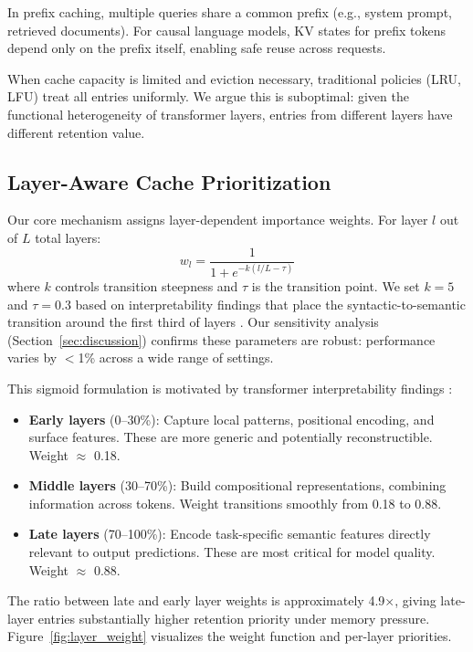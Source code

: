\documentclass[10pt,conference]{IEEEtran}
\begin{document}
In prefix caching, multiple queries share a common prefix (e.g., system prompt, retrieved documents). For causal language models, KV states for prefix tokens depend only on the prefix itself, enabling safe reuse across requests.

When cache capacity is limited and eviction necessary, traditional policies (LRU, LFU) treat all entries uniformly. We argue this is suboptimal: given the functional heterogeneity of transformer layers, entries from different layers have different retention value.

\subsection{Layer-Aware Cache Prioritization}

Our core mechanism assigns layer-dependent importance weights. For layer $l$ out of $L$ total layers:
\begin{equation}
w_l = \frac{1}{1 + e^{-k(l/L - \tau)}}
\label{eq:layer_weight}
\end{equation}
where $k$ controls transition steepness and $\tau$ is the transition point. We set $k=5$ and $\tau=0.3$ based on interpretability findings that place the syntactic-to-semantic transition around the first third of layers \cite{rogers2020primer}. Our sensitivity analysis (Section~\ref{sec:discussion}) confirms these parameters are robust: performance varies by $<$1\% across a wide range of settings.

This sigmoid formulation is motivated by transformer interpretability findings \cite{rogers2020primer,geva2023dissecting}:
\begin{itemize}
\item \textbf{Early layers} (0--30\%): Capture local patterns, positional encoding, and surface features. These are more generic and potentially reconstructible. Weight $\approx$ 0.18.
\item \textbf{Middle layers} (30--70\%): Build compositional representations, combining information across tokens. Weight transitions smoothly from 0.18 to 0.88.
\item \textbf{Late layers} (70--100\%): Encode task-specific semantic features directly relevant to output predictions. These are most critical for model quality. Weight $\approx$ 0.88.
\end{itemize}

The ratio between late and early layer weights is approximately 4.9$\times$, giving late-layer entries substantially higher retention priority under memory pressure. Figure~\ref{fig:layer_weight} visualizes the weight function and per-layer priorities.
\end{document}
